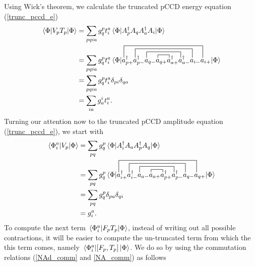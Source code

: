 \documentclass[10pt]{article}
\begin{document}
Using Wick's theorem, we calculate the truncated pCCD energy equation (\ref{trunc_pccd_e})
\begin{align}
\mel{\Phi}{V_pT_p}{\Phi}
&=
\sum_{pqia}g_q^pt_i^a\mel{\Phi}{A^\dagger_pA_qA^\dagger_aA_i}{\Phi}
\nonumber
\\
&=
\sum_{pqia}g_q^pt_i^a\mel{\Phi}{
\contraction[1ex]{a^\dagger_{p+}a^\dagger_{p-}a_{q-}}{a}{_{q+}}
{a}
\contraction[2ex]{a^\dagger_{p+}a^\dagger_{p-}}{a}{_{q-}a_{q+}
a^\dagger_{a+}}{a}
\contraction[3ex]{a^\dagger_{p+}}{a}{^\dagger_{p-}a_{q-}a_{q+}
a^\dagger_{a+}a^\dagger_{a-}}{a}
\contraction[4ex]{}{a}{^\dagger_{p+}a^\dagger_{p-}a_{q-}a_{q+}
a^\dagger_{a+}a^\dagger_{a-}a_{i-}}{a}
a^\dagger_{p+}a^\dagger_{p-}a_{q-}a_{q+}
a^\dagger_{a+}a^\dagger_{a-}a_{i-}a_{i+}
}{\Phi}
\nonumber
\\
&=
\sum_{pqia}g_q^pt_i^a\delta_{pi}\delta_{qa}
\nonumber
\\
&=
\sum_{ia}g_a^it_i^a
.\end{align}
Turning our attention now to the truncated pCCD amplitude equation (\ref{trunc_pccd_e}), we start with
\begin{align}
\mel*{\Phi_i^a}{V_p}{\Phi}
&=
\sum_{pq}g_q^p\mel*{\Phi}{A^\dagger_iA_aA^\dagger_pA_q}{\Phi}
\nonumber
\\
&=
\sum_{pq}g_q^p\mel*{\Phi}{
\contraction[1ex]{a^\dagger_{i+}a^\dagger_{i-}a_{a-}}{a}{_{a+}}
{a}
\contraction[2ex]{a^\dagger_{i+}a^\dagger_{i-}}{a}{_{a-}a_{a+}
a^\dagger_{p+}}{a}
\contraction[3ex]{a^\dagger_{i+}}{a}{^\dagger_{i-}a_{a-}a_{a+}
a^\dagger_{p+}a^\dagger_{p-}}{a}
\contraction[4ex]{}{a}{^\dagger_{i+}a^\dagger_{i-}a_{a-}a_{a+}
a^\dagger_{p+}a^\dagger_{p-}a_{q-}}{a}
a^\dagger_{i+}a^\dagger_{i-}a_{a-}a_{a+}a^\dagger_{p+}a^\dagger_{p-}a_{q-}a_{q+}
}{\Phi}
\nonumber
\\
&=
\sum_{pq}g_q^p\delta_{pa}\delta_{qi}
\nonumber
\\
&=g_i^a
.\end{align}
To compute the next term $\mel*{\Phi_i^a}{F_pT_p}{\Phi}$, instead of writing out all possible contractions, it will be easier to compute the un-truncated term from which the this term comes, namely $\mel*{\Phi_i^a}{\comm*{F_p}{T_p}}{\Phi}$. We do so by using the commutation relations (\ref{NAd_comm} and \ref{NA_comm}) as follows
\end{document}
